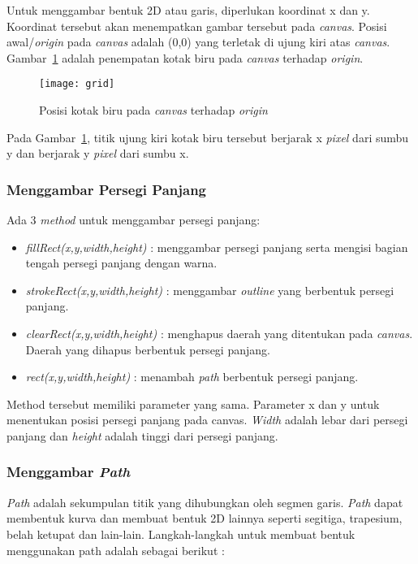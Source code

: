 Untuk menggambar bentuk 2D atau garis, diperlukan koordinat x dan y. Koordinat tersebut akan menempatkan gambar tersebut pada \textit{canvas}. Posisi awal/\textit{origin} pada \textit{canvas} adalah (0,0) yang terletak di ujung kiri atas \textit{canvas}. Gambar~\ref{fig:grid} adalah penempatan kotak biru pada \textit{canvas} terhadap \textit{origin}.

\begin{figure}[H]
	\centering  
	\texttt{[image: grid]}
	\caption[Posisi kotak biru pada \textit{canvas} terhadap \textit{origin}]{Posisi kotak biru pada \textit{canvas} terhadap \textit{origin}\cite{MDN:05:Web}}
	\label{fig:grid} 
\end{figure} 

Pada Gambar~\ref{fig:grid}, titik ujung kiri kotak biru tersebut berjarak x \textit{pixel} dari sumbu y dan berjarak y \textit{pixel} dari sumbu x. 

\subsubsection{Menggambar Persegi Panjang}
Ada 3 \textit{method} untuk menggambar persegi panjang:

\begin{itemize}
	\item \textit{fillRect(x,y,width,height)} : menggambar persegi panjang serta mengisi bagian tengah persegi panjang dengan warna.
	\item \textit{strokeRect(x,y,width,height)} : menggambar \textit{outline} yang berbentuk persegi panjang.
	\item \textit{clearRect(x,y,width,height)} : menghapus daerah yang ditentukan pada \textit{canvas}. Daerah yang dihapus berbentuk persegi panjang.
	\item \textit{rect(x,y,width,height)} : menambah \textit{path} berbentuk persegi panjang.
\end{itemize}

Method tersebut memiliki parameter yang sama. Parameter x dan y untuk menentukan posisi persegi panjang pada canvas. \textit{Width} adalah lebar dari persegi panjang dan \textit{height} adalah tinggi dari persegi panjang.

\subsubsection{Menggambar \textit{Path}}
\textit{Path} adalah sekumpulan titik yang dihubungkan oleh segmen garis. \textit{Path} dapat membentuk kurva dan membuat bentuk 2D lainnya seperti segitiga, trapesium, belah ketupat dan lain-lain. Langkah-langkah untuk membuat bentuk menggunakan path adalah sebagai berikut : 

